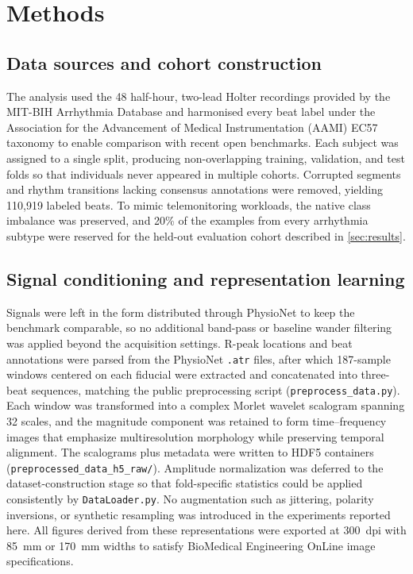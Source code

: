 \section{Methods}
\subsection{Data sources and cohort construction}
The analysis used the 48 half-hour, two-lead Holter recordings provided by the MIT-BIH Arrhythmia Database and harmonised every beat label under the Association for the Advancement of Medical Instrumentation (AAMI) EC57 taxonomy to enable comparison with recent open benchmarks.\cite{Goldberger2000PhysioBank,Kim2024FortyFive} Each subject was assigned to a single split, producing non-overlapping training, validation, and test folds so that individuals never appeared in multiple cohorts. Corrupted segments and rhythm transitions lacking consensus annotations were removed, yielding 110,919 labeled beats. To mimic telemonitoring workloads, the native class imbalance was preserved, and 20\% of the examples from every arrhythmia subtype were reserved for the held-out evaluation cohort described in \autoref{sec:results}.

\subsection{Signal conditioning and representation learning}
Signals were left in the form distributed through PhysioNet to keep the benchmark comparable, so no additional band-pass or baseline wander filtering was applied beyond the acquisition settings. R-peak locations and beat annotations were parsed from the PhysioNet \texttt{.atr} files, after which 187-sample windows centered on each fiducial were extracted and concatenated into three-beat sequences, matching the public preprocessing script (\texttt{preprocess\_data.py}). Each window was transformed into a complex Morlet wavelet scalogram spanning 32 scales, and the magnitude component was retained to form time--frequency images that emphasize multiresolution morphology while preserving temporal alignment. The scalograms plus metadata were written to HDF5 containers (\texttt{preprocessed\_data\_h5\_raw/}). Amplitude normalization was deferred to the dataset-construction stage so that fold-specific statistics could be applied consistently by \texttt{DataLoader.py}. No augmentation such as jittering, polarity inversions, or synthetic resampling was introduced in the experiments reported here. All figures derived from these representations were exported at 300~dpi with 85~mm or 170~mm widths to satisfy BioMedical Engineering OnLine image specifications.

